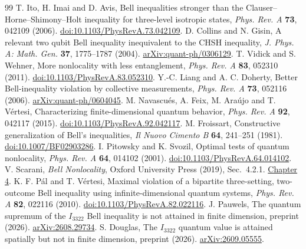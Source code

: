 \documentclass[11pt]{article}
\begin{document}
\begingroup\small
\begin{thebibliography}{99}
 T. Ito, H. Imai and D. Avis, Bell inequalities stronger than the Clauser--Horne--Shimony--Holt inequality for three-level isotropic states, \emph{Phys. Rev. A} \textbf{73}, 042109 (2006). \href{https://doi.org/10.1103/PhysRevA.73.042109}{doi:10.1103/PhysRevA.73.042109}.
 D. Collins and N. Gisin, A relevant two qubit Bell inequality inequivalent to the CHSH inequality, \emph{J. Phys. A: Math. Gen.} \textbf{37}, 1775--1787 (2004). \href{https://arxiv.org/abs/quant-ph/0306129}{arXiv:quant-ph/0306129}.
 T. Vidick and S. Wehner, More nonlocality with less entanglement, \emph{Phys. Rev. A} \textbf{83}, 052310 (2011). \href{https://doi.org/10.1103/PhysRevA.83.052310}{doi:10.1103/PhysRevA.83.052310}.
 Y.-C. Liang and A. C. Doherty, Better Bell-inequality violation by collective measurements, \emph{Phys. Rev. A} \textbf{73}, 052116 (2006). \href{https://arxiv.org/abs/quant-ph/0604045}{arXiv:quant-ph/0604045}.
 M. Navascu\'es, A. Feix, M. Ara\'ujo and T. V\'ertesi, Characterizing finite-dimensional quantum behavior, \emph{Phys. Rev. A} \textbf{92}, 042117 (2015). \href{https://doi.org/10.1103/PhysRevA.92.042117}{doi:10.1103/PhysRevA.92.042117}.
 M. Froissart, Constructive generalization of Bell's inequalities, \emph{Il Nuovo Cimento B} \textbf{64}, 241--251 (1981). \href{https://doi.org/10.1007/BF02903286}{doi:10.1007/BF02903286}.
 I. Pitowsky and K. Svozil, Optimal tests of quantum nonlocality, \emph{Phys. Rev. A} \textbf{64}, 014102 (2001). \href{https://doi.org/10.1103/PhysRevA.64.014102}{doi:10.1103/PhysRevA.64.014102}.
 V. Scarani, \emph{Bell Nonlocality}, Oxford University Press (2019), Sec.~4.2.1. \href{https://academic.oup.com/book/36528/chapter/321331722}{Chapter 4}.
 K. F. P\'al and T. V\'ertesi, Maximal violation of a bipartite three-setting, two-outcome Bell inequality using infinite-dimensional quantum systems, \emph{Phys. Rev. A} \textbf{82}, 022116 (2010). \href{https://doi.org/10.1103/PhysRevA.82.022116}{doi:10.1103/PhysRevA.82.022116}.
 J. Pauwels, The quantum supremum of the $I_{3322}$ Bell inequality is not attained in finite dimension, preprint (2026). \href{https://arxiv.org/abs/2608.29734}{arXiv:2608.29734}.
 S. Douglas, The $I_{3322}$ quantum value is attained spatially but not in finite dimension, preprint (2026). \href{https://arxiv.org/abs/2609.05555}{arXiv:2609.05555}.
\end{thebibliography}
\endgroup
\end{document}
